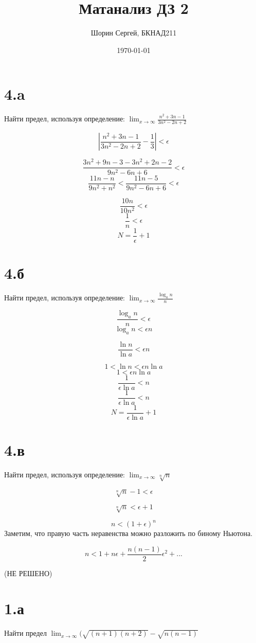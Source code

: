 \documentclass[a4paper]{article}
\author{Шорин Сергей, БКНАД211}
\title{Матанализ ДЗ 2}
\date{\today}
\begin{document}
\maketitle

\newpage

\section{4.a}
Найти предел, используя определение: 
$\displaystyle{\lim_{x \to \infty}} \frac{n^2 + 3n - 1}{3n^2 - 2n + 2}$

$$|\frac{n^2 + 3n - 1}{3n^2 - 2n + 2} - \frac{1}{3}| < \epsilon $$

$$\frac{3n^2 + 9n - 3 - 3n^2 + 2n - 2 }{9n^2 - 6n + 6} < \epsilon $$
$$\frac{ 11n - n}{9n^2 + n^2} < \frac{ 11n - 5}{9n^2 - 6n + 6} < \epsilon $$

$$\frac{ 10n}{10n^2} < \epsilon $$
$$\frac{ 1}{n} < \epsilon $$
$$N = \frac{ 1}{\epsilon} + 1 $$

\section{4.б}
Найти предел, используя определение: 
$\displaystyle{\lim_{x \to \infty}} \frac{\log_an}{n}$

$$\frac{\log_an}{n} < \epsilon $$
$$ \log_an < \epsilon n $$

$$ \frac{\ln n}{\ln a} < \epsilon n $$

$$ 1 < \ln n < \epsilon n \ln a $$
$$ 1 < \epsilon n \ln a $$
$$ \frac{1}{\epsilon \ln a} <  n  $$
$$ \frac{1}{\epsilon \ln a} <  n  $$
$$ N = \frac{1}{\epsilon \ln a} + 1  $$

\section{4.в}
Найти предел, используя определение: 
$\displaystyle{\lim_{x \to \infty}} \sqrt[n]{n}$

$$\sqrt[n]{n} - 1 < \epsilon$$

$$\sqrt[n]{n}  < \epsilon + 1$$ 

$$ n  < (1 + \epsilon ) ^ n$$ 
Заметим, что правую часть неравенства можно разложить по биному Ньютона.

$$ n  < 1 + n\epsilon + \frac{n(n-1)}{2}\epsilon^2 + ... $$ 

(НЕ РЕШЕНО)

\section{1.а}
Найти предел $ \displaystyle{\lim_{x \to \infty}}(\sqrt{(n+1)(n+2)} - \sqrt{n(n-1)} $
\end{document}
